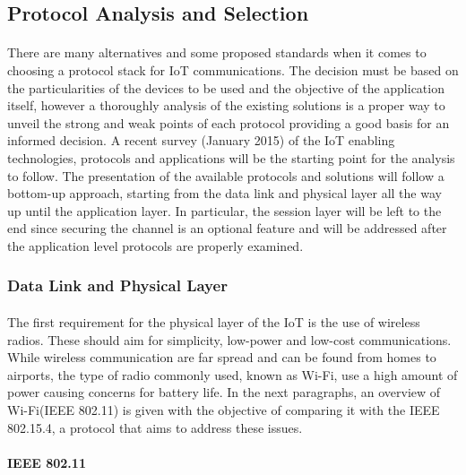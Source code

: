 \subsection{Protocol Analysis and Selection}
\label{sec:protocol_analysis}

\paragraph{}
There are many alternatives and some proposed standards when it comes to choosing a protocol stack for \ac{IoT} communications. The decision must be based on the particularities of the devices to be used and the objective of the application itself, however a thoroughly analysis of the existing solutions is a proper way to unveil the strong and weak points of each protocol providing a good basis for an informed decision. A recent survey (January 2015) \cite{Al-Fuqaha2015} of the \ac{IoT} enabling technologies, protocols and applications will be the starting point for the analysis to follow. The presentation of the available protocols and solutions will follow a bottom-up approach, starting from the data link and physical layer all the way up until the application layer. In particular, the session layer will be left to the end since securing the channel is an optional feature and will be addressed after the application level protocols are properly examined.

\subsubsection{Data Link and Physical Layer}

\paragraph{}
The first requirement for the physical layer of the \ac{IoT} is the use of wireless radios. These should aim for simplicity, low-power and low-cost communications. While wireless communication are far spread and can be found from homes to airports, the type of radio commonly used, known as Wi-Fi, use a high amount of power causing concerns for battery life. In the next paragraphs, an overview of Wi-Fi(IEEE 802.11) is given with the objective of comparing it with the IEEE 802.15.4, a protocol that aims to address these issues.

\paragraph{\textbf{IEEE 802.11}}
